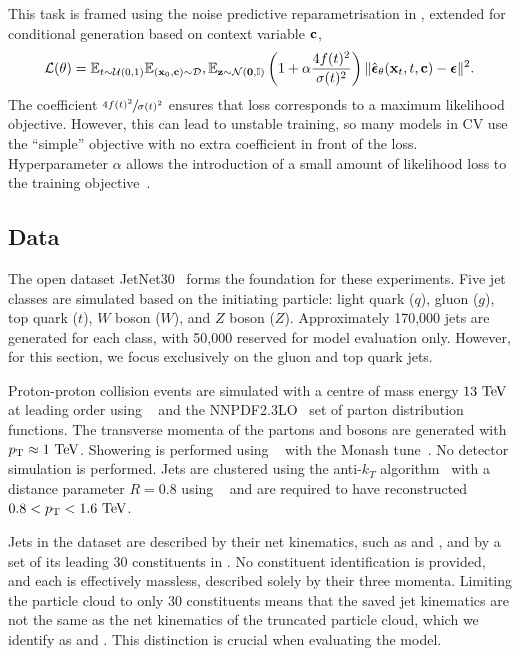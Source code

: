 This task is framed using the noise predictive reparametrisation in , extended for conditional generation based on context variable $\mathbf{c}$,
\begin{equation}
    \label{eq:training_objective}
    \mathcal{L}(\theta) =
    \mathbb{E}_{t\sim \mathcal{U}(0, 1)}
    \mathbb{E}_{(\mathbf{x}_0, \mathbf{c}) \sim \mathcal{D}},
    \mathbb{E}_{\mathbf{z} \sim \mathcal{N}(\mathbf{0}, \mathbb{I})}
    \left(1 + \alpha \frac{4f(t)^2}{\sigma(t)^2}\right)
    \| \hat{\boldsymbol{\epsilon}}_\theta (\mathbf{x}_t, t, \mathbf{c}) - \boldsymbol{\epsilon} \|^2.
\end{equation}
The coefficient $\sfrac{4f(t)^2}{\sigma(t)^2}$ ensures that loss corresponds to a maximum likelihood objective.
However, this can lead to unstable training, so many models in CV use the ``simple'' objective with no extra coefficient in front of the loss.
Hyperparameter $\alpha$ allows the introduction of a small amount of likelihood loss to the training objective~\cite{ImprovedDenoisingDiffusion}.

\subsection{Data}
\label{sec:jetgen_data}

The open dataset JetNet30~\cite{MPGAN} forms the foundation for these experiments.
Five jet classes are simulated based on the initiating particle: light quark ($q$), gluon ($g$), top quark ($t$), $W$ boson ($W$), and $Z$ boson ($Z$).
Approximately 170,000 jets are generated for each class, with 50,000 reserved for model evaluation only.
However, for this section, we focus exclusively on the gluon and top quark jets.

Proton-proton collision events are simulated with a centre of mass energy $13~\TeV$ at leading order using \madgraph~\cite{MadGraph} and the \textsc{NNPDF2.3LO}~\cite{PDF2.3} set of parton distribution functions.
The transverse momenta of the partons and bosons are generated with $\pt \approx 1~\TeV$.
Showering is performed using ~\cite{Pythia8} with the Monash tune~\cite{Monash}.
No detector simulation is performed.
Jets are clustered using the anti-$k_T$ algorithm~\cite{AntiKt} with a distance parameter $R=0.8$ using \fastjet~\cite{FastJet} and are required to have reconstructed $0.8 < \pt < 1.6~\TeV$.

Jets in the dataset are described by their net kinematics, such as \mjet and \ptjet, and by a set of its leading 30 constituents in \pt.
No constituent identification is provided, and each is effectively massless, described solely by their three momenta.
Limiting the particle cloud to only 30 constituents means that the saved jet kinematics are not the same as the net kinematics of the truncated particle cloud, which we identify as \mpc and \ptpc.
This distinction is crucial when evaluating the model.

